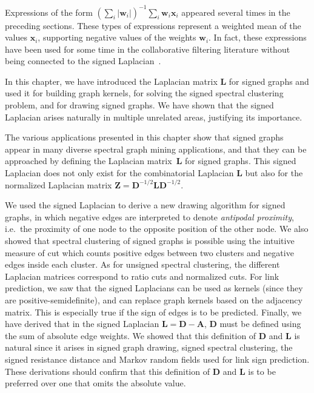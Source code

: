 \documentclass[11pt,a4paper]{book}
\begin{document}
Expressions of the form $(\sum_i |\mathbf w_i|)^{-1} \sum_i \mathbf w_i
\mathbf x_i$ appeared several times in the 
preceding sections.  These types of expressions represent a weighted mean of the
values $\mathbf x_i$, supporting negative values of the weights $\mathbf w_i$. 
In fact, these expressions have been used for some
time in the collaborative filtering literature without being connected
to the signed Laplacian~\cite{b132}.

\label{sec:signed::conclusion}
In this chapter, we have introduced the Laplacian matrix $\mathbf L$ for signed
graphs and used it 
for building graph kernels, for solving the signed spectral clustering
problem, and for drawing signed graphs.  We have shown that the signed
Laplacian arises naturally in multiple unrelated areas, justifying its
importance. 

The various applications presented in this chapter show that signed graphs
appear in many diverse spectral graph mining applications, and that they
can be approached by defining the Laplacian matrix~$\mathbf L$ for
signed graphs.  
This signed Laplacian does not only exist for the combinatorial
Laplacian $\mathbf L$ 
but also for the normalized Laplacian matrix $\mathbf Z = \mathbf
D^{-1/2}\mathbf L\mathbf D^{-1/2}$. 

We used the signed Laplacian to derive a new drawing algorithm for
signed graphs, in which negative edges are interpreted to denote
\emph{antipodal proximity}, i.e.\ the proximity of one node to the
opposite position of the other node. 
We also showed that spectral clustering of signed graphs is possible using the
intuitive measure of cut which counts positive edges between two
clusters and negative edges inside each cluster.  As for unsigned
spectral clustering, the different Laplacian matrices correspond to
ratio cuts and normalized cuts. 
For link prediction, we saw that the signed Laplacians can be used as kernels
(since they are positive-semidefinite), and can replace graph kernels
based on the adjacency matrix.  This is especially true if the sign of
edges is to be predicted.  
Finally, we have derived that in the signed Laplacian $\mathbf L = \mathbf D -
\mathbf A$, $\mathbf D$ must be defined using the sum of absolute
edge weights.  We showed that this definition of $\mathbf D$ and
$\mathbf L$ is natural since it arises in signed graph drawing, signed
spectral clustering, the signed resistance distance and Markov random
fields used for link sign prediction. 
These derivations should confirm that this definition of $\mathbf D$ and
$\mathbf L$ is to be preferred over one that omits the absolute
value. 
\end{document}
